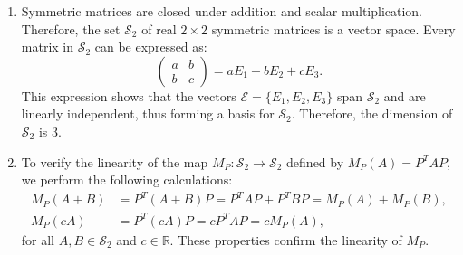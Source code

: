 \documentclass{report}
\begin{document}
\begin{enumerate}[label=(\alph*)]
\setcounter{enumi}{0}
\item Symmetric matrices are closed under addition and scalar multiplication. Therefore, the set \(\mathcal{S}_2\) of real \(2 \times 2\) symmetric matrices is a vector space. Every matrix in \(\mathcal{S}_2\) can be expressed as:
\[
\begin{pmatrix} a & b \\ b & c \end{pmatrix} = aE_1 + bE_2 + cE_3.
\]
This expression shows that the vectors \(\mathcal{E} = \{E_1, E_2, E_3\}\) span \(\mathcal{S}_2\) and are linearly independent, thus forming a basis for \(\mathcal{S}_2\). Therefore, the dimension of \(\mathcal{S}_2\) is 3.

\item To verify the linearity of the map \(M_P: \mathcal{S}_2 \to \mathcal{S}_2\) defined by \(M_P(A) = P^TAP\), we perform the following calculations:
\begin{align*}
M_P(A+B) &= P^T(A+B)P = P^TAP + P^TBP = M_P(A) + M_P(B), \\
M_P(cA) &= P^T(cA)P = cP^TAP = cM_P(A),
\end{align*}
for all \(A, B \in \mathcal{S}_2\) and \(c \in \mathbb{R}\). These properties confirm the linearity of \(M_P\).


\end{enumerate}
\end{document}
